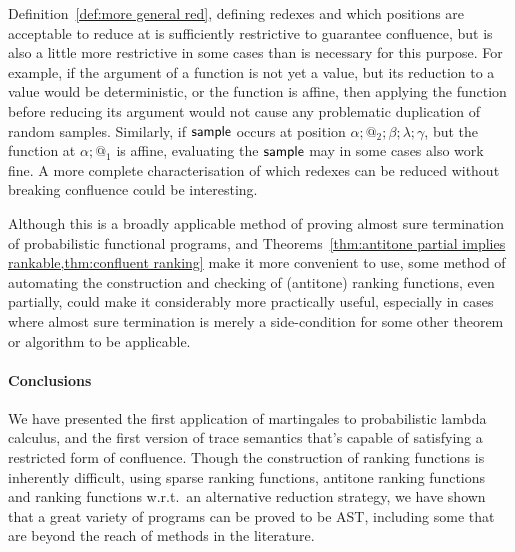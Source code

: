 Definition~\ref{def:more general red}, defining redexes and which positions are acceptable to reduce at is sufficiently restrictive to guarantee confluence, but is also a little more restrictive in some cases than is necessary for this purpose. For example, if the argument of a function is not yet a value, but its reduction to a value would be deterministic, or the function is affine, then applying the function before reducing its argument would not cause any problematic duplication of random samples. Similarly, if $\mathsf{sample}$ occurs at position $\alpha;@_2;\beta;\lambda;\gamma$, but the function at $\alpha;@_1$ is affine, evaluating the $\mathsf{sample}$ may in some cases also work fine. A more complete characterisation of which redexes can be reduced without breaking confluence could be interesting.

Although this is a broadly applicable method of proving almost sure termination of probabilistic functional programs, and Theorems~\ref{thm:antitone partial implies rankable,thm:confluent ranking} make it more convenient to use, some method of automating the construction and checking of (antitone) ranking functions, even partially, could make it considerably more practically useful, especially in cases where almost sure termination is merely a side-condition for some other theorem or algorithm to be applicable.

\paragraph*{Conclusions}

We have presented the first application of martingales to probabilistic lambda calculus, and the first version of trace semantics that's capable of satisfying a restricted form of confluence.
Though the construction of ranking functions is inherently difficult, using sparse ranking functions, antitone ranking functions and ranking functions w.r.t.~an alternative reduction strategy, we have shown that a great variety of programs can be proved to be AST, including some that are beyond the reach of methods in the literature.

